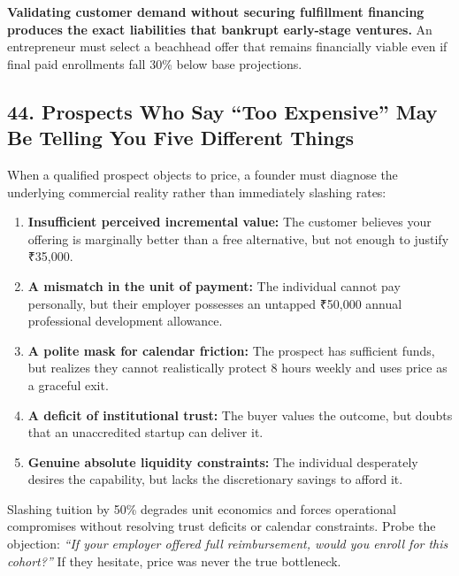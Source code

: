 \textbf{Validating customer demand without securing fulfillment financing produces the exact liabilities that bankrupt early-stage ventures.} An entrepreneur must select a beachhead offer that remains financially viable even if final paid enrollments fall 30\% below base projections.

\subsection*{44. Prospects Who Say ``Too Expensive'' May Be Telling You Five Different Things}

When a qualified prospect objects to price, a founder must diagnose the underlying commercial reality rather than immediately slashing rates:

\begin{enumerate}
    \item \textbf{Insufficient perceived incremental value:} The customer believes your offering is marginally better than a free alternative, but not enough to justify ₹35,000.
    \item \textbf{A mismatch in the unit of payment:} The individual cannot pay personally, but their employer possesses an untapped ₹50,000 annual professional development allowance.
    \item \textbf{A polite mask for calendar friction:} The prospect has sufficient funds, but realizes they cannot realistically protect 8 hours weekly and uses price as a graceful exit.
    \item \textbf{A deficit of institutional trust:} The buyer values the outcome, but doubts that an unaccredited startup can deliver it.
    \item \textbf{Genuine absolute liquidity constraints:} The individual desperately desires the capability, but lacks the discretionary savings to afford it.
\end{enumerate}

Slashing tuition by 50\% degrades unit economics and forces operational compromises without resolving trust deficits or calendar constraints. Probe the objection: \emph{``If your employer offered full reimbursement, would you enroll for this cohort?''} If they hesitate, price was never the true bottleneck.
